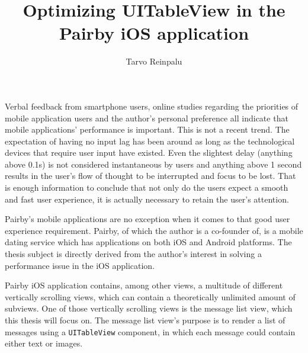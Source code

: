 \documentclass[a4paper,12pt]{article}
\begin{document}
\begin{itkTitlePage}
\title{Optimizing UITableView in the Pairby iOS application}
\author{Tarvo Reinpalu}
\end{itkTitlePage}




\itkMakeAuthorDeclaration

\clearpage
\thispagestyle{empty}
\tableofcontents
\newpage




\newpage
{}
Verbal feedback from smartphone users, online studies regarding the priorities of mobile application users\cite{AppSpeedStudyHP}\cite{AppSpeedStudyApigee} and the author's personal preference all indicate that mobile applications' performance is important. This is not a recent trend. The expectation of having no input lag has been around as long as the technological devices that require user input have existed.\cite{NielsenUsabilityEngineering} Even the slightest delay (anything above 0.1s) is not considered instantaneous by users and anything above 1 second results in the user's flow of thought to be interrupted and focus to be lost.\cite{NielsenUsabilityEngineering} That is enough information to conclude that not only do the users expect a smooth and fast user experience, it is actually necessary to retain the user's attention.

Pairby's mobile applications are no exception when it comes to that good user experience requirement. Pairby, of which the author is a co-founder of, is a mobile dating service which has applications on both iOS and Android platforms. The thesis subject is directly derived from the author's interest in solving a performance issue in the iOS application.

Pairby iOS application contains, among other views, a multitude of different vertically scrolling views, which can contain a theoretically unlimited amount of subviews. One of those vertically scrolling views is the message list view, which this thesis will focus on. The message list view's purpose is to render a list of messages using a \texttt{UITableView} component, in which each message could contain either text or images.
\end{document}
